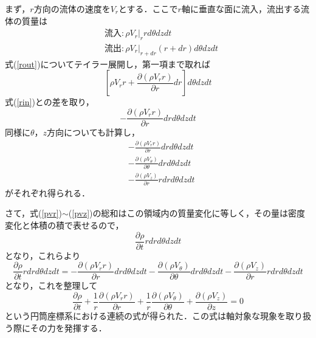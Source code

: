 \documentclass{jsarticle}
\newcommand{\pfrac}[2]{\frac{\partial{}{#1}}{\partial{}{#2}}}
\begin{document}
まず，$r$方向の流体の速度を$V_r$とする．ここで$r$軸に垂直な面に流入，流出する流体の質量は
\begin{align}
  &流入: \rho{}V_r|_{r}rd\theta{}dzdt\label{rin}\\
  &流出: \rho{}V_r|_{r+dr}(r+dr)d\theta{}dzdt\label{rout}
\end{align}
式(\ref{rout})についてテイラー展開し，第一項まで取れば
\begin{equation}
  \left[\rho{}V_rr+\pfrac{(\rho{}V_rr)}{r}dr\right]d\theta{}dzdt
\end{equation}
式(\ref{rin})との差を取り，
\begin{equation}
  -\pfrac{(\rho{}V_rr)}{r}drd\theta{}dzdt
\end{equation}
同様に$\theta{}$，$z$方向についても計算し，
\begin{align}
  &-\pfrac{(\rho{}V_rr)}{r}drd\theta{}dzdt\label{pvr}\\
  &-\pfrac{(\rho{}V_\theta{})}{\theta{}}drd\theta{}dzdt\label{pvtheta}\\
  &-\pfrac{(\rho{}V_z)}{r}rdrd\theta{}dzdt\label{pvz}
\end{align}
がそれぞれ得られる．

さて，式(\ref{pvr})$\sim$(\ref{pvz})の総和はこの領域内の質量変化に等しく，その量は密度変化と体積の積で表せるので，
\begin{equation}
  \pfrac{\rho{}}{t}rdrd\theta{}dzdt
\end{equation}
となり，これらより
\begin{equation}
  \pfrac{\rho{}}{t}rdrd\theta{}dzdt=-\pfrac{(\rho{}V_rr)}{r}drd\theta{}dzdt-\pfrac{(\rho{}V_\theta{})}{\theta{}}drd\theta{}dzdt-\pfrac{(\rho{}V_z)}{r}rdrd\theta{}dzdt
\end{equation}
となり，これを整理して
\begin{equation}
  \pfrac{\rho{}}{t}+\frac{1}{r}\pfrac{(\rho{}V_rr)}{r}+\frac{1}{r}\pfrac{(\rho{}V_\theta{})}{\theta{}}+\pfrac{(\rho{}V_z)}{z}=0
\end{equation}
という円筒座標系における連続の式が得られた．この式は軸対象な現象を取り扱う際にその力を発揮する．
\end{document}
